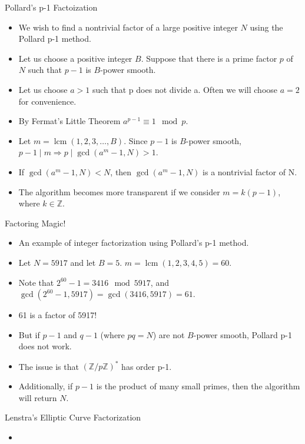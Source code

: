 \documentclass{beamer}
\DeclareMathOperator{\lcm}{lcm}
\begin{document}
	\begin{frame}{Pollard's p-1 Factoization}
		\begin{itemize}
			\item We wish to find a nontrivial factor of a large positive integer $N$ using the Pollard p-1 method.
			\item Let us choose a positive integer $B$. Suppose that there is a prime factor $p$ of $N$ such that $p-1$ is $B$-power smooth.
			\item Let us choose $a > 1$ such that p does not divide a. Often we will choose $a=2$ for convenience.
			\item By Fermat's Little Theorem $a^{p-1} \equiv 1 \mod p$.
			\item Let $m = \lcm (1,2,3,\dotso,B)$. Since $p-1$ is $B$-power smooth, $p-1 \mid m \Longrightarrow p \mid \gcd (a^m-1,N) > 1$.
			\item If $\gcd (a^m-1,N) < N$, then $\gcd (a^m-1,N)$ is a nontrivial factor of N.
			\item The algorithm becomes more transparent if we consider $m=k(p-1)$, where $k\in\mathbb{Z}$.
		\end{itemize}
	\end{frame}
	
	\begin{frame}{Factoring Magic!}
		\begin{itemize}
			\item An example of integer factorization using Pollard's p-1 method.
			\item Let $N=5917$ and let $B=5$. $m=\lcm (1,2,3,4,5)=60$.
			\item Note that $2^{60}-1=3416 \mod 5917$, and $\gcd (2^{60}-1, 5917)=\gcd (3416, 5917)=61$.
			\item 61 is a factor of 5917!
			\item But if $p-1$ and $q-1$ (where $pq=N$) are not $B$-power smooth, Pollard p-1 does not work.
			\item The issue is that $(\mathbb{Z}/p\mathbb{Z})^*$ has order p-1.
			\item Additionally, if $p-1$ is the product of many small primes, then the algorithm will return $N$.
		\end{itemize}
	\end{frame}
	
	\begin{frame}{Lenstra's Elliptic Curve Factorization}
		\begin{itemize}
			\item 
		\end{itemize}
	\end{frame}
\end{document}
